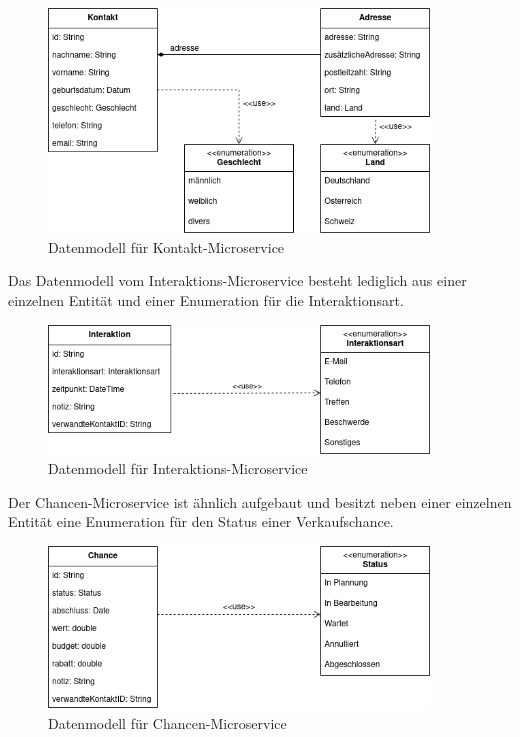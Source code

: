 \begin{figure}[H] 
    \centering
    \includegraphics[width=0.9\textwidth]{figures/DatenmodellKontakt.png}
    \caption{Datenmodell für Kontakt-Microservice}
\end{figure} 

Das Datenmodell vom Interaktions-Microservice besteht lediglich aus einer einzelnen Entität und einer Enumeration für die Interaktionsart.

\begin{figure}[H] 
    \centering
    \includegraphics[width=0.9\textwidth]{figures/DatenmodellInteraktion.png}
    \caption{Datenmodell für Interaktions-Microservice}
\end{figure}

Der Chancen-Microservice ist ähnlich aufgebaut und besitzt neben einer einzelnen Entität eine Enumeration für den Status einer Verkaufschance.

\begin{figure}[H] 
    \centering
    \includegraphics[width=0.9\textwidth]{figures/DatenmodellChance.png}
    \caption{Datenmodell für Chancen-Microservice}
\end{figure}

